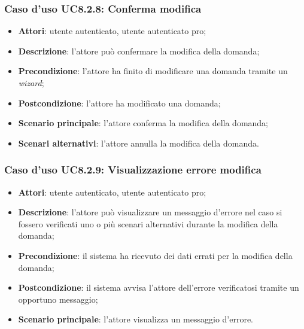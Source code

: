 	\subsubsection{Caso d'uso UC8.2.8: Conferma modifica}
	\begin{itemize}
		\item
		\textbf{Attori}: utente autenticato, utente autenticato pro;
		\item
		\textbf{Descrizione}: l'attore può confermare la modifica della domanda;
		\item		
		\textbf{Precondizione}: l'attore ha finito di modificare una domanda tramite un \textit{wizard};
		\item
		\textbf{Postcondizione}: l'attore ha modificato una domanda;
		\item
		\textbf{Scenario principale}: l'attore conferma la modifica della domanda;		
		\item
		\textbf{Scenari alternativi}: l'attore annulla la modifica della domanda.
	\end{itemize}		
	\subsubsection{Caso d'uso UC8.2.9: Visualizzazione errore modifica}
	\begin{itemize}
		\item
		\textbf{Attori}: utente autenticato, utente autenticato pro;
		\item
		\textbf{Descrizione}: l'attore può visualizzare un messaggio d'errore nel caso si fossero verificati uno o più scenari alternativi durante la modifica della domanda;
		\item		
		\textbf{Precondizione}: il sistema ha ricevuto dei dati errati per la modifica della domanda;
		\item
		\textbf{Postcondizione}: il sistema avvisa l'attore dell'errore verificatosi tramite un opportuno messaggio;
		\item
		\textbf{Scenario principale}: l'attore visualizza un messaggio d'errore.	
	\end{itemize}	

